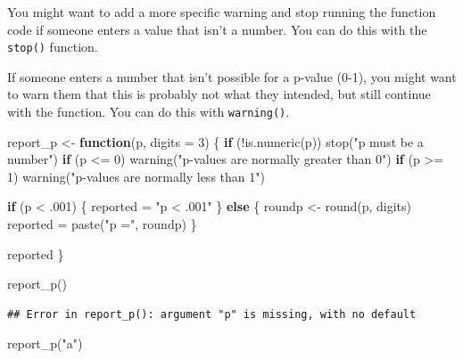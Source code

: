 \documentclass[
  oneside]{book}
\newenvironment{Shaded}{\begin{snugshade}}{\end{snugshade}}
\newcommand{\AttributeTok}[1]{\textcolor[rgb]{0.77,0.63,0.00}{#1}}
\newcommand{\ControlFlowTok}[1]{\textcolor[rgb]{0.13,0.29,0.53}{\textbf{#1}}}
\newcommand{\DecValTok}[1]{\textcolor[rgb]{0.00,0.00,0.81}{#1}}
\newcommand{\FunctionTok}[1]{\textcolor[rgb]{0.00,0.00,0.00}{#1}}
\newcommand{\NormalTok}[1]{#1}
\newcommand{\OtherTok}[1]{\textcolor[rgb]{0.56,0.35,0.01}{#1}}
\newcommand{\SpecialCharTok}[1]{\textcolor[rgb]{0.00,0.00,0.00}{#1}}
\newcommand{\StringTok}[1]{\textcolor[rgb]{0.31,0.60,0.02}{#1}}
\begin{document}
You might want to add a more specific warning and stop running the function code if someone enters a value that isn't a number. You can do this with the \texttt{stop()} function.

If someone enters a number that isn't possible for a p-value (0-1), you might want to warn them that this is probably not what they intended, but still continue with the function. You can do this with \texttt{warning()}.

\begin{Shaded}
\begin{Highlighting}[]
\NormalTok{report\_p }\OtherTok{\textless{}{-}} \ControlFlowTok{function}\NormalTok{(p, }\AttributeTok{digits =} \DecValTok{3}\NormalTok{) \{}
  \ControlFlowTok{if}\NormalTok{ (}\SpecialCharTok{!}\FunctionTok{is.numeric}\NormalTok{(p)) }\FunctionTok{stop}\NormalTok{(}\StringTok{"p must be a number"}\NormalTok{)}
  \ControlFlowTok{if}\NormalTok{ (p }\SpecialCharTok{\textless{}=} \DecValTok{0}\NormalTok{) }\FunctionTok{warning}\NormalTok{(}\StringTok{"p{-}values are normally greater than 0"}\NormalTok{)}
  \ControlFlowTok{if}\NormalTok{ (p }\SpecialCharTok{\textgreater{}=} \DecValTok{1}\NormalTok{) }\FunctionTok{warning}\NormalTok{(}\StringTok{"p{-}values are normally less than 1"}\NormalTok{)}
  
  \ControlFlowTok{if}\NormalTok{ (p }\SpecialCharTok{\textless{}}\NormalTok{ .}\DecValTok{001}\NormalTok{) \{}
\NormalTok{    reported }\OtherTok{=} \StringTok{"p \textless{} .001"}
\NormalTok{  \} }\ControlFlowTok{else}\NormalTok{ \{}
\NormalTok{    roundp }\OtherTok{\textless{}{-}} \FunctionTok{round}\NormalTok{(p, digits)}
\NormalTok{    reported }\OtherTok{=} \FunctionTok{paste}\NormalTok{(}\StringTok{"p ="}\NormalTok{, roundp)}
\NormalTok{  \}}
  
\NormalTok{  reported}
\NormalTok{\}}
\end{Highlighting}
\end{Shaded}

\begin{Shaded}
\begin{Highlighting}[]
\FunctionTok{report\_p}\NormalTok{()}
\end{Highlighting}
\end{Shaded}

\begin{verbatim}
## Error in report_p(): argument "p" is missing, with no default
\end{verbatim}

\begin{Shaded}
\begin{Highlighting}[]
\FunctionTok{report\_p}\NormalTok{(}\StringTok{"a"}\NormalTok{)}
\end{Highlighting}
\end{Shaded}
\end{document}
